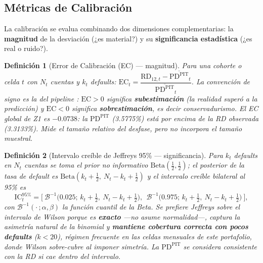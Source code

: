 \documentclass[12pt, a4paper]{article}
\newcommand{\PDPIT}{\ensuremath{\mathrm{PD}^{\mathrm{PIT}}}}
\newcommand{\RD}{\ensuremath{\mathrm{RD}}}
\newcommand{\EC}{\ensuremath{\mathrm{EC}}}
\newtheorem{definicion}{Definición}[section]
\begin{document}
\subsection{Métricas de Calibración}
La calibración se evalua combinando dos dimensiones complementarias: la \textbf{magnitud} de la
desviación (¿es material?) y su \textbf{significancia estadística} (¿es real o ruido?).

\begin{definicion}[Error de Calibración (EC) --- magnitud]
Para una cohorte o celda $t$ con $N_t$ cuentas y $k_t$ defaults:
$\EC_t = \dfrac{\RD_{12,t}-\overline{\PDPIT}_t}{\overline{\PDPIT}_t}$. La convención de signo es la
del pipeline : $\EC>0$ significa
\textbf{subestimación} (la realidad superó a la predicción) y $\EC<0$ significa
\textbf{sobrestimación}, es decir conservadurismo. El EC global de Z1 es $-0.0738$: la \PDPIT{}
(3.5775\%) está por encima de la RD observada (3.3133\%). Mide el tamaño \emph{relativo} del
desfase, pero no incorpora el tamaño muestral.
\end{definicion}

\begin{definicion}[Intervalo creíble de Jeffreys 95\% --- significancia]
\label{def:jeffreys}
\label{def:wilson}
Para $k_t$ defaults en $N_t$ cuentas se toma el prior no informativo $\mathrm{Beta}(\tfrac12,\tfrac12)$;
el posterior de la tasa de default es $\mathrm{Beta}(k_t+\tfrac12,\ N_t-k_t+\tfrac12)$ y el
intervalo creíble bilateral al 95\% es
\begin{equation}
  \mathrm{IC}^{95\%}_{t}=\Big[\ \mathcal{B}^{-1}\!\big(0.025;\,k_t+\tfrac12,\ N_t-k_t+\tfrac12\big),\ \
  \mathcal{B}^{-1}\!\big(0.975;\,k_t+\tfrac12,\ N_t-k_t+\tfrac12\big)\ \Big],
\end{equation}
con $\mathcal{B}^{-1}(\cdot\,;\alpha,\beta)$ la función cuantil de la Beta. Se prefiere Jeffreys
sobre el intervalo de Wilson porque es \textbf{exacto} ---no asume normalidad---, captura la
asimetría natural de la binomial y \textbf{mantiene cobertura correcta con pocos defaults}
($k<20$), régimen frecuente en las celdas mensuales de este portafolio, donde Wilson sobre-cubre al
imponer simetría. La \PDPIT{} se considera consistente con la RD si cae dentro del intervalo.
\end{definicion}
\end{document}
